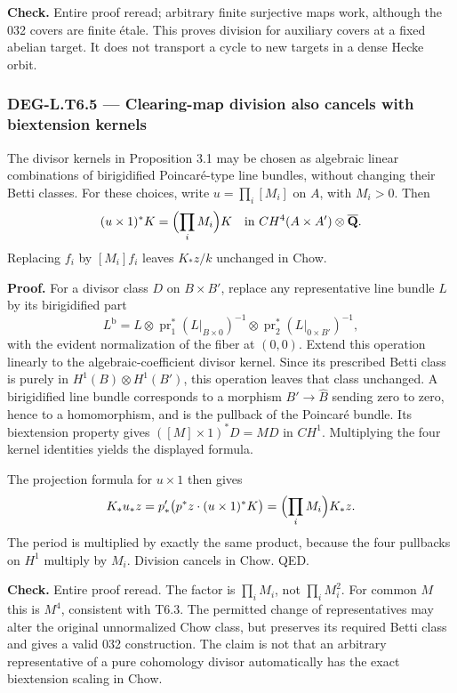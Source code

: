\textbf{Check.} Entire proof reread; arbitrary finite surjective maps work, although the 032 covers are finite étale. This proves division for auxiliary covers at a fixed abelian target. It does not transport a cycle to new targets in a dense Hecke orbit.

\subsubsection{DEG-L.T6.5 --- Clearing-map division also cancels with biextension kernels}\label{DEG-L.T6.5}

The divisor kernels in Proposition 3.1 may be chosen as algebraic linear combinations of birigidified Poincaré-type line bundles, without changing their Betti classes. For these choices, write \(u=\prod_i[M_i]\) on \(A\), with \(M_i>0\). Then \[
(u\times1)^*K=\Bigl(\prod_i M_i\Bigr)K
\quad\hbox{in }CH^4(A\times A')\otimes\overline{\mathbf Q}.
\] Replacing \(f_i\) by \([M_i]f_i\) leaves \(K_*z/k\) unchanged in Chow.

\textbf{Proof.} For a divisor class \(D\) on \(B\times B'\), replace any representative line bundle \(L\) by its birigidified part \[
L^{\mathrm b}=L\otimes\operatorname{pr}_1^*(L|_{B\times0})^{-1}
\otimes\operatorname{pr}_2^*(L|_{0\times B'})^{-1},
\] with the evident normalization of the fiber at \((0,0)\). Extend this operation linearly to the algebraic-coefficient divisor kernel. Since its prescribed Betti class is purely in \(H^1(B)\otimes H^1(B')\), this operation leaves that class unchanged. A birigidified line bundle corresponds to a morphism \(B'\to\widehat B\) sending zero to zero, hence to a homomorphism, and is the pullback of the Poincaré bundle. Its biextension property gives \(([M]\times1)^*D=M D\) in \(CH^1\). Multiplying the four kernel identities yields the displayed formula.

The projection formula for \(u\times1\) then gives \[
K_*u_*z=p'_*\bigl(p^*z\cdot(u\times1)^*K\bigr)
=\Bigl(\prod_iM_i\Bigr)K_*z.
\] The period is multiplied by exactly the same product, because the four pullbacks on \(H^1\) multiply by \(M_i\). Division cancels in Chow. QED.

\textbf{Check.} Entire proof reread. The factor is \(\prod_iM_i\), not \(\prod_iM_i^2\). For common \(M\) this is \(M^4\), consistent with T6.3. The permitted change of representatives may alter the original unnormalized Chow class, but preserves its required Betti class and gives a valid 032 construction. The claim is not that an arbitrary representative of a pure cohomology divisor automatically has the exact biextension scaling in Chow.

